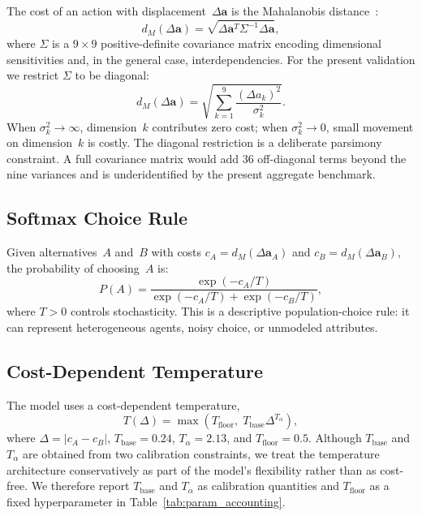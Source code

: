 \documentclass[journal]{IEEEtran}
\begin{document}
The cost of an action with displacement~$\Delta\mathbf{a}$ is the Mahalanobis distance~\cite{mahalanobis1936}:
\begin{equation}
    d_M(\Delta\mathbf{a}) = \sqrt{\Delta\mathbf{a}^T \Sigma^{-1} \Delta\mathbf{a}},
    \label{eq:mahalanobis}
\end{equation}
where $\Sigma$ is a $9 \times 9$ positive-definite covariance matrix encoding dimensional sensitivities and, in the general case, interdependencies.
For the present validation we restrict $\Sigma$ to be diagonal:
\begin{equation}
    d_M(\Delta\mathbf{a}) = \sqrt{\sum_{k=1}^{9} \frac{(\Delta a_k)^2}{\sigma_k^2}}.
    \label{eq:mahalanobis_diag}
\end{equation}
When $\sigma_k^2 \to \infty$, dimension~$k$ contributes zero cost; when $\sigma_k^2 \to 0$, small movement on dimension~$k$ is costly.
The diagonal restriction is a deliberate parsimony constraint.
A full covariance matrix would add 36 off-diagonal terms beyond the nine variances and is underidentified by the present aggregate benchmark.

\subsection{Softmax Choice Rule}

Given alternatives~$A$ and~$B$ with costs $c_A = d_M(\Delta\mathbf{a}_A)$ and $c_B = d_M(\Delta\mathbf{a}_B)$, the probability of choosing~$A$ is:
\begin{equation}
    P(A) = \frac{\exp(-c_A/T)}{\exp(-c_A/T) + \exp(-c_B/T)},
    \label{eq:softmax}
\end{equation}
where $T > 0$ controls stochasticity.
This is a descriptive population-choice rule: it can represent heterogeneous agents, noisy choice, or unmodeled attributes.

\subsection{Cost-Dependent Temperature}

The model uses a cost-dependent temperature,
\begin{equation}
    T(\Delta) = \max\!\left(T_{\text{floor}},\; T_{\text{base}} \Delta^{T_\alpha}\right),
    \label{eq:temperature}
\end{equation}
where $\Delta = |c_A - c_B|$, $T_{\text{base}} = 0.24$, $T_\alpha = 2.13$, and $T_{\text{floor}} = 0.5$.
Although $T_{\text{base}}$ and $T_\alpha$ are obtained from two calibration constraints, we treat the temperature architecture conservatively as part of the model's flexibility rather than as cost-free.
We therefore report $T_{\text{base}}$ and $T_\alpha$ as calibration quantities and $T_{\text{floor}}$ as a fixed hyperparameter in Table~\ref{tab:param_accounting}.
\end{document}
